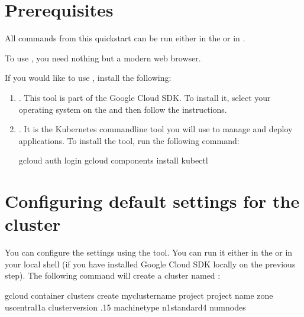 \documentclass[letterpaper,10pt,english]{sphinxmanual}
\begin{document}
\section{Prerequisites}
\label{\detokenize{gke:prerequisites}}
All commands from this quickstart can be run either in the  or in .

To use , you need nothing but a modern web browser.

If you would like to use , install the following:
\begin{enumerate}
%
\item {} 
. This tool is part of the Google Cloud SDK. To install it, select your operating system on the  and then follow the instructions.

\item {} 
. It is the Kubernetes command\sphinxhyphen{}line tool you will use to manage and deploy applications. To install the tool, run the following command:

\begin{sphinxVerbatim}[commandchars=\\\{\}]
\PYGZdl{} gcloud auth login
\PYGZdl{} gcloud components install kubectl
\end{sphinxVerbatim}

\end{enumerate}


\section{Configuring default settings for the cluster}
\label{\detokenize{gke:configuring-default-settings-for-the-cluster}}
You can configure the settings using the  tool. You can run it either in the  or in your local shell (if you have installed Google Cloud SDK locally on the previous step). The following command will create a cluster named :

\begin{sphinxVerbatim}[commandchars=\\\{\}]
\PYGZdl{} gcloud container clusters create my\PYGZhy{}cluster\PYGZhy{}name \PYGZhy{}\PYGZhy{}project \PYGZlt{}project name\PYGZgt{} \PYGZhy{}\PYGZhy{}zone us\PYGZhy{}central1\PYGZhy{}a \PYGZhy{}\PYGZhy{}cluster\PYGZhy{}version .15 \PYGZhy{}\PYGZhy{}machine\PYGZhy{}type n1\PYGZhy{}standard\PYGZhy{}4 \PYGZhy{}\PYGZhy{}num\PYGZhy{}nodes
\end{sphinxVerbatim}
\end{document}
